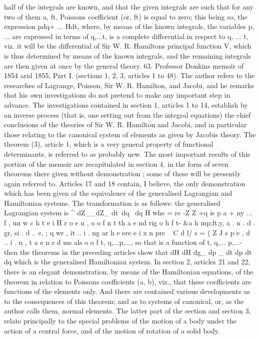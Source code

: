 \documentclass[12pt,a4paper]{article}
\theoremstyle{definition}
\begin{document}

half of the integrals are known, and that the given integrals are such that for any
two of them a, ft, Poissons coefficient (or, ft) is equal to zero; this being so, the
expression pdq+ ... Hdt, where, by means of the known integrals, the variables p, ...
are expressed in terms of q,...t, is a complete differential in respect to q, ... t, viz.
it will be the differential of Sir W. R. Hamiltons principal function V, which is
thus determined by means of the known integrals, and the remaining integrals are
then given at once by the general theory.
63. Professor Donkins memoir of 1854 arid 1855, Part I. (sections 1, 2, 3, articles
1 to 48). The author refers to the researches of Lagrange, Poisson, Sir W. R. Hamilton,
and Jacobi, and he remarks that his own investigations do not pretend to make any
important step in advance. The investigations contained in section 1, articles 1 to 14,
establish by an inverse process (that is, one setting out from the integral equations)
the chief conclusions of the theories of Sir W. R. Hamilton and Jacobi, and in
particular those relating to the canonical system of elements as given by Jacobis
theory. The theorem (3), article 1, which is a very general property of functional
determinants, is referred to as probably new. The most important results of this portion
of the memoir are recapitulated in section 4, in the form of seven theorems there
given without demonstration ; some of these will be presently again referred to. Articles
17 and 18 contain, I believe, the only demonstration which has been given of the
equivalence of the generalised Lagrangian and Hamiltonian systems. The transformation
is as follows: the generalised Lagrangian system is
^
dZ__dZ_
dt~dq ~dq
H whe = re -Z Z +q is p a + ny ... f , un w c h t e i H r o e n , o o f n t th a e nd rig o h f t- &a h mp;lt;y, a . n . d . gr, si . d .. e, ; q wr , it .. i . ng ar h e ere e i x n pre ~ C d l/ s = ( Z J s p e , d .. i . n , t a e n r d ms als o o f
t, q,...p,..., so that is a function of t, q,... p,...- then the theorems in the
preceding articles show that
dH dH
dg_ dp _
dt dp dt~ dq
which is the generalised Hamiltonian system.
In section 2, articles 21 and 22, there is an elegant demonstration, by means of
the Hamiltonian equations, of the theorem in relation to Poissons coefficients (a, b),
viz., that these coefficients are functions of the elements only. And there are contained
various developments as to the consequences of this theorem; and as to systems of
canonical, or, as the author calls them, normal elements. The latter part of the
section and section 3, relate principally to the special problems of the motion of a
body under the action of a central force, and of the motion of rotation of a solid body.
\end{document}
